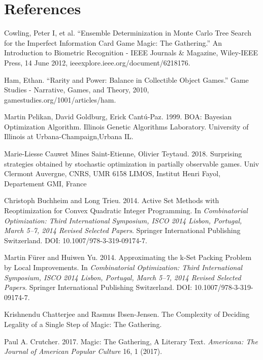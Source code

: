 \documentclass[12pt, letterpaper]{article}
\begin{document}
\section{References}



Cowling, Peter I, et al.
\enquote{Ensemble Determinization in Monte Carlo Tree Search for the Imperfect Information Card Game Magic: The Gathering.}
An Introduction to Biometric Recognition - IEEE Journals \& Magazine, Wiley-IEEE Press,
14 June 2012, ieeexplore.ieee.org/document/6218176.

Ham, Ethan.
\enquote{Rarity and Power: Balance in Collectible Object Games.}
Game Studies - Narrative, Games, and Theory, 2010,
gamestudies.org/1001/articles/ham.


Martin Pelikan, David Goldburg, Erick Cantú-Paz. 1999. BOA: Bayesian Optimization Algorithm. Illinois Genetic Algorithms
Laboratory. University of Illinois at Urbana-Champaign,Urbana IL.

Marie-Liesse Cauwet Mines Saint-Etienne, Olivier Teytaud. 2018. Surprising strategies obtained by stochastic
optimization in partially observable games. Univ Clermont Auvergne, CNRS, UMR 6158 LIMOS, Institut Henri Fayol,
Departement GMI, France


Christoph Buchheim and Long Trieu. 2014.
Active Set Methods with Reoptimization for Convex Quadratic Integer Programming.
In \textit{Combinatorial Optimization: Third International Symposium,
ISCO 2014 Lisbon, Portugal, March 5–7, 2014 Revised Selected Papers}.
Springer International Publishing Switzerland.
DOI: 10.1007/978-3-319-09174-7.

Martin Fürer and Huiwen Yu. 2014.
Approximating the k-Set Packing Problem by Local Improvements.
In \textit{Combinatorial Optimization: Third International Symposium,
ISCO 2014 Lisbon, Portugal, March 5–7, 2014 Revised Selected Papers}.
Springer International Publishing Switzerland.
DOI: 10.1007/978-3-319-09174-7.


Krishnendu Chatterjee and Rasmus Ibsen-Jensen.
The Complexity of Deciding Legality of a Single Step of Magic: The Gathering.

Paul A. Crutcher. 2017. Magic: The Gathering, A Literary Text.
\textit{Americana: The Journal of American Popular Culture} 16, 1 (2017).
\end{document}
